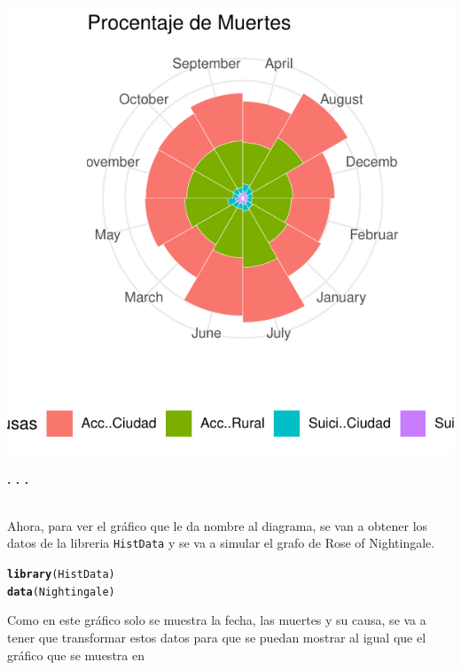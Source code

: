 \documentclass{article}\usepackage[]{graphicx}\usepackage[]{color}
\makeatletter
\def\maxwidth{ %
  \ifdim\Gin@nat@width>\linewidth
    \linewidth
  \else
    \Gin@nat@width
  \fi
}
\newcommand{\hlstd}[1]{\textcolor[rgb]{0.345,0.345,0.345}{#1}}%
\newcommand{\hlkwd}[1]{\textcolor[rgb]{0.737,0.353,0.396}{\textbf{#1}}}%
\newenvironment{kframe}{%
 \def\at@end@of@kframe{}%
 \ifinner\ifhmode%
  \def\at@end@of@kframe{\end{minipage}}%
  \begin{minipage}{\columnwidth}%
 \fi\fi%
 \def\FrameCommand##1{\hskip\@totalleftmargin \hskip-\fboxsep
 \colorbox{shadecolor}{##1}\hskip-\fboxsep
     \hskip-\linewidth \hskip-\@totalleftmargin \hskip\columnwidth}%
 \MakeFramed {\advance\hsize-\width
   \@totalleftmargin\z@ \linewidth\hsize
   \@setminipage}}%
 {\par\unskip\endMakeFramed%
 \at@end@of@kframe}
\newenvironment{knitrout}{}{} %
\makeatother
\begin{document}
\begin{knitrout}
\color{fgcolor}

{\centering \includegraphics[width=\maxwidth]{figure/plot_rose_1-1} 

}



\end{knitrout}
\begin{center}
\textbf{. . .}
\end{center}
~\\
Ahora, para ver el gr\'afico que le da nombre al diagrama, se van a obtener los datos de la libreria \texttt{HistData} y se va a simular el grafo de Rose of Nightingale.
\begin{knitrout}
\color{fgcolor}\begin{kframe}
\begin{alltt}
\hlkwd{library}\hlstd{(HistData)}
\hlkwd{data}\hlstd{(Nightingale)}
\end{alltt}
\end{kframe}
\end{knitrout}
Como en este gr\'afico solo se muestra la fecha, las muertes y su causa, se va a tener que transformar estos datos para que se puedan mostrar al igual que el gr\'afico que se muestra en %
\end{document}

